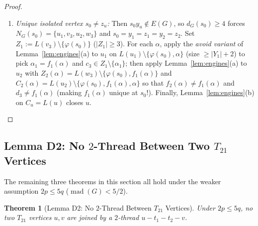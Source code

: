 \documentclass[11pt,a4paper]{article}
\newtheorem{theorem}{Theorem}[section]
\theoremstyle{definition}
\newcommand{\mad}{\operatorname{mad}}
\begin{document}
\begin{proof}
\begin{itemize}[leftmargin=*,itemsep=2pt]
\begin{enumerate}[label=\arabic*.,leftmargin=*,itemsep=1pt]
    \item \emph{Unique isolated vertex $s_0 \neq z_u$:} Then $s_0 y_u \notin E(G)$, so $d_G(s_0) \ge 4$ forces $N_G(s_0) = \{u_1, v_3, u_2, w_3\}$ and $s_0 = y_1 = z_1 = y_2 = z_2$. Set $Z_1 := L(v_3) \setminus \{\varphi(s_0)\}$ ($|Z_1| \ge 3$). For each $\alpha$, apply the \emph{avoid variant} of Lemma~\ref{lem:engines}(a) to $u_1$ on $L(u_1) \setminus \{\varphi(s_0), \alpha\}$ (size $\ge |Y_1| + 2$) to pick $\alpha_1 = f_1(\alpha)$ and $c_3 \in Z_1 \setminus \{\alpha_1\}$; then apply Lemma~\ref{lem:engines}(a) to $u_2$ with $Z_2(\alpha) = L(w_3) \setminus \{\varphi(s_0), f_1(\alpha)\}$ and $C_2(\alpha) = L(u_2) \setminus \{\varphi(s_0), f_1(\alpha), \alpha\}$ so that $f_2(\alpha) \neq f_1(\alpha)$ and $d_3 \neq f_1(\alpha)$ (making $f_1(\alpha)$ unique at $s_0$!). Finally, Lemma~\ref{lem:engines}(b) on $C_u = L(u)$ closes $u$. \qedhere
  \end{enumerate}
\end{itemize}
\end{proof}

\subsection{Lemma D2: No \texorpdfstring{$2$}{2}-Thread Between Two \texorpdfstring{$T_{21}$}{T21} Vertices}

The remaining three theorems in this section all hold under the weaker assumption $2p \le 5q$ ($\mad(G) < 5/2$).

\begin{theorem}[Lemma D2: No $2$-Thread Between $T_{21}$ Vertices]\label{thm:T21-2th}
Under $2p \le 5q$, no two $T_{21}$ vertices $u, v$ are joined by a $2$-thread $u - t_1 - t_2 - v$.
\end{theorem}
\end{document}
